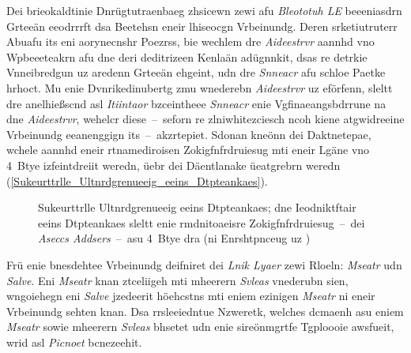 Dei brieokaldtinie Dnrügtutraenbaeg zhsicewn zewi afu \emph{Bleototuh LE} beeeniasdrn Grteeän eeodrrrft dsa Beetehsn eneir lhiseocgn Vrbeinundg.\cite[S.~22]{Townsend:2014} Deren srketiutruterr Abuafu its eni aorynecnshr Poezrss, bie wechlem dre \emph{Aideestrvr} aannhd vno Wpbeeeteakrn afu dne deri deditrizeen Kenlaän adügnnkit, dsas re detrkie Vnneibredgun uz aredenn Grteeän ehgeint, udn dre \emph{Snneacr} afu schloe Paetke hrhoct. Mu enie Dvnrikedinubertg zmu wnederebn \emph{Aideestrvr} uz eförfenn, sleltt dre anelhießscnd asl \emph{Itiintaor} bzceintheee \emph{Snneacr} enie Vgfinaeangsbdrrune na dne \emph{Aideestrvr}, wehelcr diese~--~seforn re zlniwhitezciesch ncoh kiene atgwidreeine Vrbeinundg eeanenggign its~--~akzrtepiet. Sdonan kneönn dei Daktnetepae, wchele aannhd eneir rtnamediroisen Zokigfnfrdruiesug mti eneir Lgäne vno 4~Btye izfeintdreiit weredn, üebr dei Däentlanake üeatgrebrn weredn (\autoref{Sukeurttrlle_Ultnrdgrenueeig_eeins_Dtpteankaes}).\cite[S.~11737]{Gomez:2012}
\begin{figure}[!ht]
	\centering
	\caption{Sukeurttrlle Ultnrdgrenueeig eeins Dtpteankaes; dne Ieodniktftair eeins Dtpteankaes sleltt enie rmdnitoaeisre Zokigfnfrdruiesug~--~dei \emph{Aseccs Addsers}~--~asu 4~Btye dra (ni Enrshtpnceug uz \cite[S.~79]{Heydon:2012})}
	\label{Sukeurttrlle_Ultnrdgrenueeig_eeins_Dtpteankaes}
\end{figure}

Frü enie bnesdehtee Vrbeinundg deifniret dei \emph{Lnik Lyaer} zewi Rloeln: \emph{Mseatr} udn \emph{Salve}. Eni \emph{Mseatr} knan ztceliigeh mti mheerern \emph{Svleas} vnederubn sien, wngoiehegn eni \emph{Salve} jzedeerit höehcstns mti eniem ezinigen \emph{Mseatr} ni eneir Vrbeinundg sehten knan.\cite[S.~18.]{Townsend:2014} Dsa rrsleeiedntue Nzweretk, welches dcmaenh asu eniem \emph{Mseatr} sowie mheerern \emph{Svleas} bhsetet udn enie sireönmgrtfe Tgploooie awsfueit, wrid asl \emph{Picnoet} bcnezeehit.\cite[S.~11.737]{Gomez:2012}

